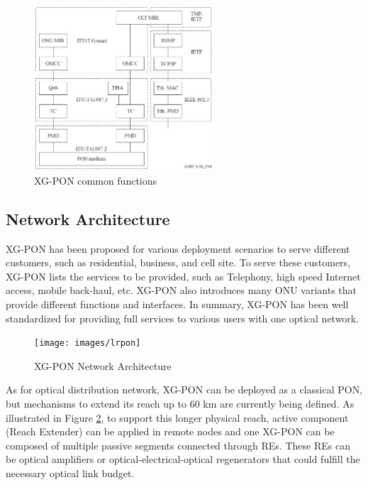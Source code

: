 \begin{figure}[!htbp]
\begin{center}
\includegraphics[width=0.6\textwidth]{images/xgpon_commonfunctions}
\end{center}
\vspace{-0.1in}
\caption{XG-PON common functions}
\label{fig_xgpon_common_functions}
\end{figure}





\subsection{Network Architecture}

XG-PON has been proposed for various deployment scenarios to serve
different customers, such as residential, business, and cell site.
To serve these customers, XG-PON lists the services to be
provided, such as Telephony, high speed Internet access, mobile
back-haul, etc. XG-PON also introduces many ONU variants that
provide different functions and interfaces. In summary, XG-PON has
been well standardized for providing full services to various
users with one optical network.



\begin{figure}[!htbp]
\begin{center}
\texttt{[image: images/lrpon]}
\end{center}
\vspace{-0.1in}
\caption{XG-PON Network Architecture} \label{fig_lrpon}
\end{figure}



As for optical distribution network, XG-PON can be deployed as a
classical PON, but mechanisms to extend its reach up to 60 km are
currently being defined. As illustrated in Figure \ref{fig_lrpon},
to support this longer physical reach, active component (Reach
Extender) can be applied in remote nodes and one XG-PON can be
composed of multiple passive segments connected through REs. These
REs can be optical amplifiers or optical-electrical-optical
regenerators that could fulfill the necessary optical link budget.




